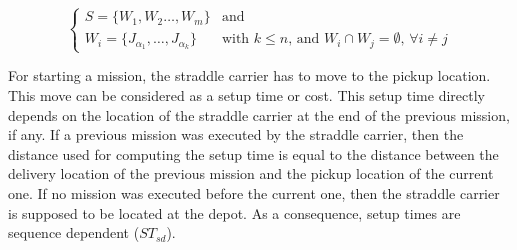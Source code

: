\documentclass[a4paper,10pt]{article}
\begin{document}
\begin{equation*}
\begin{cases}
 S = \{ W_{1} , W_{2} \ldots , W_{m}\} & \text{and}\\
 W_{i} = \{ J_{\alpha_1} , \ldots , J_{\alpha_k} \} & \text{with $k \leq n$, and $W_{i} \cap W_{j} = \emptyset$,  $\forall i \neq j$} 
\end{cases}
\end{equation*}
 


For starting a mission, the straddle carrier has to move to the pickup location. This move can be considered as a setup time or cost. This setup time directly depends on the location of the straddle carrier at the end of the previous mission, if any. If a previous mission was executed by the straddle carrier, then the distance used for computing the setup time is equal to the distance between the delivery location of the previous mission and the pickup location of the current one. If no mission was executed before the current one, then the straddle carrier is supposed to be located at the depot. As a consequence, setup times are sequence dependent ($ST_{sd}$). 
\end{document}
